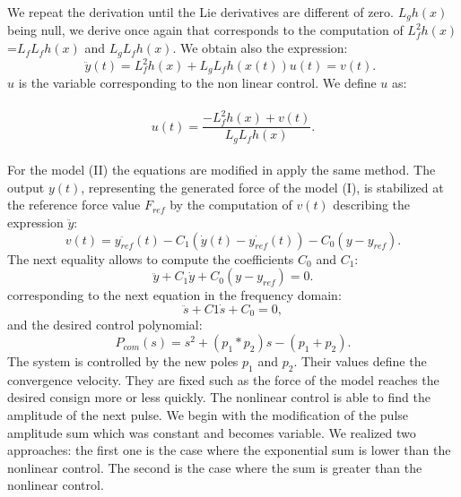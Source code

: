 \documentclass[10pt,twocolumn,letterpaper, 
]{article}
\begin{document}
We repeat the derivation until the Lie derivatives are different of zero. $L_gh(x)$ being null, we derive once again that corresponds to the computation of $L_f^2h(x)$=$L_fL_fh(x)$ and $L_gL_fh(x)$. We obtain also the expression:
\begin{equation}
\ddot{y}(t)=L_f^2h(x)+L_gL_fh(x(t))u(t)=v(t). \ \ 
\end{equation}
$u$ is the variable corresponding to the non linear control. We define $u$ as:
\ \ \ \ \ \ \ \ \ \ \ \  \begin{equation} u(t)=\frac{-L_f^2h(x)+v(t)}{L_gL_fh(x)}. \end{equation}\\

For the model (II) the equations are modified in apply the same method. The output $y(t)$, representing the generated force of the model (I), is stabilized at the reference force value $F_{ref}$ by the computation of $v(t)$ describing the expression $\ddot{y}$:
\begin{equation}
v(t)=\ddot{y_{ref}}(t)-C_1(\dot{y}(t)-\dot{y_{ref}}(t))-C_0(y-y_{ref}).
\end{equation}
The next equality allows to compute the coefficients $C_0$ and $C_1$:
\begin{equation}
\ddot{y}+C_1\dot{y}+C_0(y-y_{ref})=0.
\end{equation}
corresponding to the next equation in the frequency domain:
\begin{equation}
\ddot{s}+C1\dot{s}+C_0=0,
\end{equation}
and the desired control polynomial:
\begin{equation}
 P_{com}(s)= s^2+(p_1*p_2)s-(p_1+p_2).
\end{equation}
The system is controlled by the new poles $p_1$ and $p_2$. Their values define the convergence velocity. They are fixed such as the force of the model reaches the desired consign more or less quickly. The nonlinear control is able to find the amplitude of the next pulse. We begin with the modification of the pulse amplitude sum which was constant and becomes variable. We realized two approaches: the first one is the case where the exponential sum is lower than the nonlinear control. The second is the case where the sum is greater than the nonlinear control.
\end{document}
